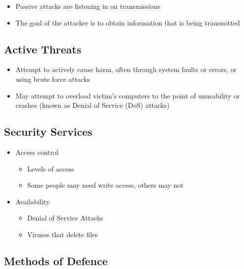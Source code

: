 \begin{itemize}
  \item Passive attacks are listening in on transmissions
  \item The goal of the attacker is to obtain information that is being transmitted
\end{itemize}

\subsection*{Active Threats}

\begin{itemize}
  \item Attempt to actively cause harm, often through system faults or errors, or using brute force attacks
  \item May attempt to overload victim's computers to the point of unusability or crashes (known as Denial of Service (DoS) attacks)
\end{itemize}

\subsection*{Security Services}

\begin{itemize}
  \item Access control
  \begin{itemize}
    \item Levels of access
    \item Some people may need write access, others may not
  \end{itemize}
  \item Availability
  \begin{itemize}
    \item Denial of Service Attacks
    \item Viruses that delete files
  \end{itemize}
\end{itemize}

\subsection*{Methods of Defence}

